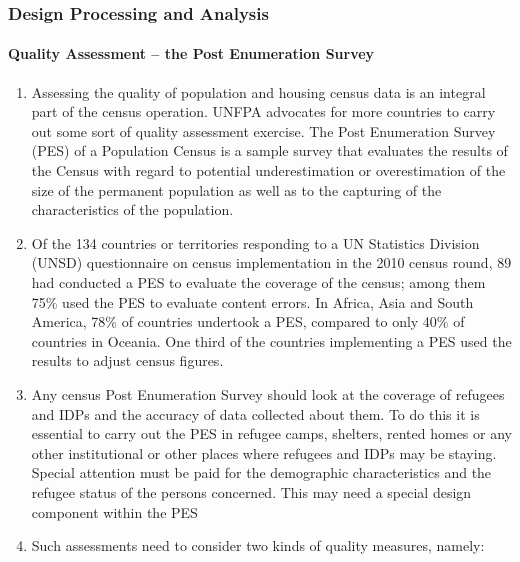\documentclass[
]{article}
\begin{document}
\hypertarget{design-processing-and-analysis}{%
\subsubsection{Design Processing and Analysis}\label{design-processing-and-analysis}}

\hypertarget{a.1.-quality-assessment-the-post-enumeration-survey}{%
\paragraph{Quality Assessment -- the Post Enumeration Survey}\label{a.1.-quality-assessment-the-post-enumeration-survey}}

\begin{enumerate}
\def\labelenumi{\arabic{enumi}.}
\setcounter{enumi}{107}
\item
  Assessing the quality of population and housing census data is an
  integral part of the census operation. UNFPA advocates for more
  countries to carry out some sort of quality assessment exercise. The
  Post Enumeration Survey (PES) of a Population Census is a sample
  survey that evaluates the results of the Census with regard to
  potential underestimation or overestimation of the size of the
  permanent population as well as to the capturing of the
  characteristics of the population.
\item
  Of the 134 countries or territories responding to a UN Statistics
  Division (UNSD) questionnaire on census implementation in the 2010
  census round, 89 had conducted a PES to evaluate the coverage of the
  census; among them 75\% used the PES to evaluate content errors. In
  Africa, Asia and South America, 78\% of countries undertook a PES,
  compared to only 40\% of countries in Oceania. One third of the
  countries implementing a PES used the results to adjust census
  figures.
\item
  Any census Post Enumeration Survey should look at the coverage of
  refugees and IDPs and the accuracy of data collected about them. To
  do this it is essential to carry out the PES in refugee camps,
  shelters, rented homes or any other institutional or other places
  where refugees and IDPs may be staying. Special attention must be
  paid for the demographic characteristics and the refugee status of
  the persons concerned. This may need a special design component
  within the PES
\item
  Such assessments need to consider two kinds of quality measures,
  namely:
\end{enumerate}
\end{document}
